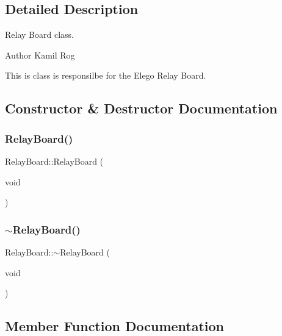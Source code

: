 \subsection{Detailed Description}
Relay Board class. 

\begin{DoxyAuthor}{Author}
Kamil Rog
\end{DoxyAuthor}
This is class is responsilbe for the Elego Relay Board. 

\subsection{Constructor \& Destructor Documentation}
\mbox{\label{classRelayBoard_aa788c15cfc95188f5935f9d9d9fe86d2}} 
\subsubsection{\texorpdfstring{Relay\+Board()}{RelayBoard()}}
{\footnotesize\ttfamily Relay\+Board\+::\+Relay\+Board (\begin{DoxyParamCaption}\item[{void}]{ }\end{DoxyParamCaption})\hspace{0.3cm}{\ttfamily [inline]}}

\mbox{\label{classRelayBoard_af05bb34a287c76312104a427c86c658e}} 
\subsubsection{\texorpdfstring{$\sim$\+Relay\+Board()}{~RelayBoard()}}
{\footnotesize\ttfamily Relay\+Board\+::$\sim$\+Relay\+Board (\begin{DoxyParamCaption}\item[{void}]{ }\end{DoxyParamCaption})\hspace{0.3cm}{\ttfamily [inline]}}



\subsection{Member Function Documentation}
\mbox{\label{classRelayBoard_a83e2f4e38c382c0bf4a56d04640cfc27}} 
